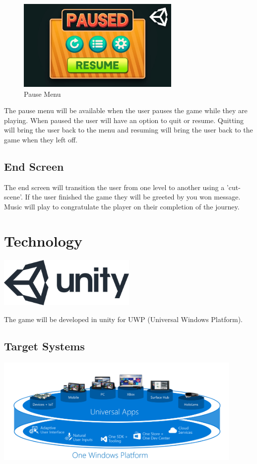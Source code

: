 \documentclass[a4paper]{scrreprt}
\begin{document}
\begin{figure}[H]
\centering
\includegraphics[width=0.70\textwidth]{pause}
\caption{\label{fig:art} Pause Menu}
\end{figure}

The pause menu will be available when the user pauses the game while they are playing. When paused the user will have an option to quit or resume.
Quitting will bring the user back to the menu and resuming will bring the user back to the game when they left off.

\section{End Screen}

The end screen will transition the user from one level to another using a 'cut-scene'. If the user finished the game they will be greeted by you won message.
Music will play to congratulate the player on their completion of the journey.


\chapter{Technology}

\includegraphics[width=0.50\textwidth]{Unity}

The game will be developed in unity for UWP (Universal Windows Platform).

\section{Target Systems}

\begin{center}
\includegraphics[width=12cm]{uwp}
\end{center}
\end{document}
